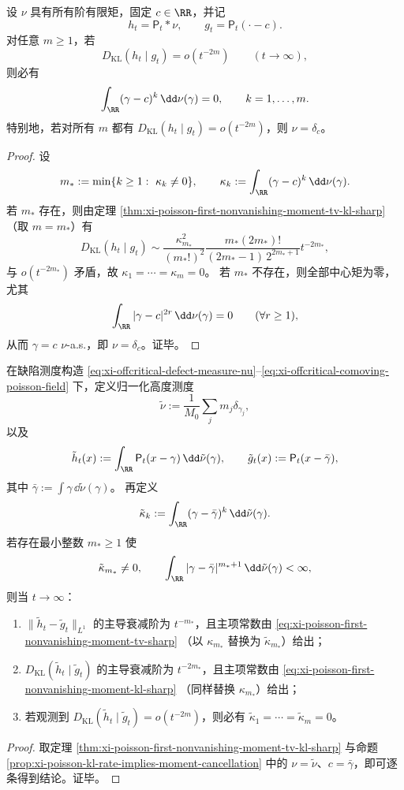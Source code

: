 \begin{proposition}[KL 衰减阶对矩消失的必要条件]\label{prop:xi-poisson-kl-rate-implies-moment-cancellation}
设 \(\nu\) 具有所有阶有限矩，固定 \(c\in\RR\)，并记
\[
h_t=\mathsf P_t*\nu,\qquad
g_t=\mathsf P_t(\cdot-c).
\]
对任意 \(m\ge 1\)，若
\[
D_{\mathrm{KL}}(h_t\mid g_t)=o(t^{-2m})\qquad(t\to\infty),
\]
则必有
\[
\int_{\RR}(\gamma-c)^k\,\dd\nu(\gamma)=0,\qquad k=1,\dots,m.
\]
特别地，若对所有 \(m\) 都有
\(
D_{\mathrm{KL}}(h_t\mid g_t)=o(t^{-2m})
\)，则 \(\nu=\delta_c\)。
\end{proposition}
\begin{proof}
设
\[
m_\ast:=\min\{k\ge 1:\ \kappa_k\neq 0\},
\qquad
\kappa_k:=\int_{\RR}(\gamma-c)^k\,\dd\nu(\gamma).
\]
若 \(m_\ast\) 存在，则由定理
\ref{thm:xi-poisson-first-nonvanishing-moment-tv-kl-sharp}
（取 \(m=m_\ast\)）有
\[
D_{\mathrm{KL}}(h_t\mid g_t)\sim
\frac{\kappa_{m_\ast}^2}{(m_\ast!)^2}
\frac{m_\ast(2m_\ast)!}{(2m_\ast-1)\,2^{2m_\ast+1}}
t^{-2m_\ast},
\]
与 \(o(t^{-2m_\ast})\) 矛盾，故 \(\kappa_1=\cdots=\kappa_m=0\)。
若 \(m_\ast\) 不存在，则全部中心矩为零，尤其
\[
\int_{\RR}|\gamma-c|^{2r}\,\dd\nu(\gamma)=0\qquad(\forall r\ge 1),
\]
从而 \(\gamma=c\) \(\nu\)-a.s.，即 \(\nu=\delta_c\)。证毕。
\end{proof}

\begin{theorem}\label{thm:xi-poisson-defect-measure-multipole-fingerprint-classification}
在缺陷测度构造
\eqref{eq:xi-offcritical-defect-measure-nu}--\eqref{eq:xi-offcritical-comoving-poisson-field}
下，定义归一化高度测度
\[
\tilde\nu:=\frac1{M_0}\sum_j m_j\delta_{\gamma_j},
\]
以及
\[
\tilde h_t(x):=\int_{\RR}\mathsf P_t(x-\gamma)\,\dd\tilde\nu(\gamma),\qquad
\tilde g_t(x):=\mathsf P_t(x-\bar\gamma),
\]
其中 \(\bar\gamma:=\int \gamma\,\dd\tilde\nu(\gamma)\)。
再定义
\[
\tilde\kappa_k:=\int_{\RR}(\gamma-\bar\gamma)^k\,\dd\tilde\nu(\gamma).
\]
若存在最小整数 \(m_\ast\ge 1\) 使
\[
\tilde\kappa_{m_\ast}\neq 0,\qquad
\int_{\RR}|\gamma-\bar\gamma|^{m_\ast+1}\,\dd\tilde\nu(\gamma)<\infty,
\]
则当 \(t\to\infty\)：
\begin{enumerate}
\item \(\|\tilde h_t-\tilde g_t\|_{L^1}\) 的主导衰减阶为 \(t^{-m_\ast}\)，且主项常数由
\eqref{eq:xi-poisson-first-nonvanishing-moment-tv-sharp}
（以 \(\kappa_{m_\ast}\) 替换为 \(\tilde\kappa_{m_\ast}\)）给出；
\item \(D_{\mathrm{KL}}(\tilde h_t\mid \tilde g_t)\) 的主导衰减阶为 \(t^{-2m_\ast}\)，且主项常数由
\eqref{eq:xi-poisson-first-nonvanishing-moment-kl-sharp}
（同样替换 \(\kappa_{m_\ast}\)）给出；
\item 若观测到
\(
D_{\mathrm{KL}}(\tilde h_t\mid \tilde g_t)=o(t^{-2m})
\)，则必有
\(
\tilde\kappa_1=\cdots=\tilde\kappa_m=0
\)。
\end{enumerate}
\end{theorem}
\begin{proof}
取定理 \ref{thm:xi-poisson-first-nonvanishing-moment-tv-kl-sharp} 与命题
\ref{prop:xi-poisson-kl-rate-implies-moment-cancellation}
中的 \(\nu=\tilde\nu\)、\(c=\bar\gamma\)，即可逐条得到结论。证毕。
\end{proof}

\endinput
